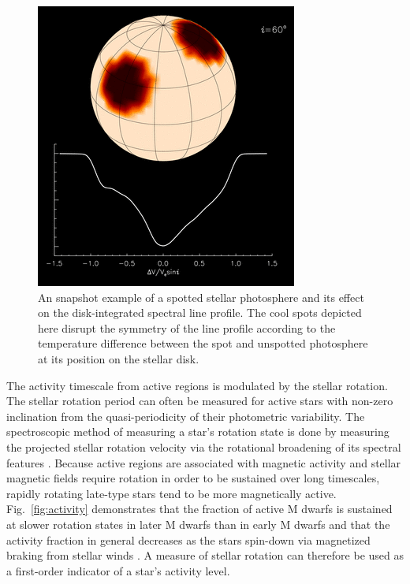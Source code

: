 \begin{figure}
  \centering
  \includegraphics[scale=.8]{figures/starspot.png}
  \caption[Illustration of the effect of active regions on the integrated stellar line profile.]
      {An snapshot example of a spotted stellar photosphere and its effect on the disk-integrated
    spectral line profile. The cool spots depicted here disrupt the symmetry of the
    line profile according to the temperature difference between the spot and
    unspotted photosphere at its position on the stellar disk.
    \citep[Image credit:][]{kochukhov16}}
  \label{fig:starspot}
\end{figure}

The activity timescale from active regions is modulated by the stellar rotation. The stellar rotation
period \prot{} can often be measured for active stars with non-zero
inclination from the quasi-periodicity of their photometric variability.
The spectroscopic method of measuring a star's rotation state is done by measuring the projected
stellar rotation velocity  via the rotational broadening
of its spectral features \citep{gray08}.
Because active regions are associated with magnetic activity and stellar
magnetic fields require rotation in order to be sustained over long timescales, rapidly rotating
late-type stars tend to be more magnetically active.
Fig.~\ref{fig:activity} demonstrates that the fraction of active M dwarfs is sustained at slower
rotation states in later M dwarfs than in early M dwarfs and that the activity fraction in general 
decreases as the stars spin-down via magnetized braking from stellar winds
\citep{skumanich72}. A measure of stellar rotation can therefore be used as a first-order
indicator of a star's activity level. \\

